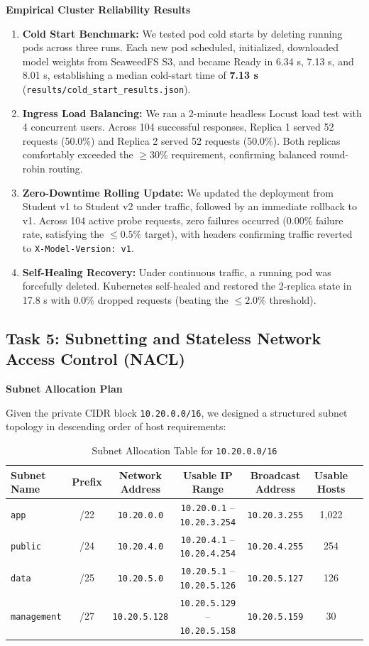 \documentclass[10pt,a4paper]{article}
\begin{document}
\textbf{Empirical Cluster Reliability Results}
\begin{enumerate}
    \item \textbf{Cold Start Benchmark:} We tested pod cold starts by deleting running pods across three runs. Each new pod scheduled, initialized, downloaded model weights from SeaweedFS S3, and became Ready in 6.34 s, 7.13 s, and 8.01 s, establishing a median cold-start time of \textbf{7.13 s} (\texttt{results/cold\_start\_results.json}).
    \item \textbf{Ingress Load Balancing:} We ran a 2-minute headless Locust load test with 4 concurrent users. Across 104 successful responses, Replica 1 served 52 requests (50.0\%) and Replica 2 served 52 requests (50.0\%). Both replicas comfortably exceeded the $\ge 30\%$ requirement, confirming balanced round-robin routing.
    \item \textbf{Zero-Downtime Rolling Update:} We updated the deployment from Student v1 to Student v2 under traffic, followed by an immediate rollback to v1. Across 104 active probe requests, zero failures occurred (0.00\% failure rate, satisfying the $\le 0.5\%$ target), with headers confirming traffic reverted to \texttt{X-Model-Version: v1}.
    \item \textbf{Self-Healing Recovery:} Under continuous traffic, a running pod was forcefully deleted. Kubernetes self-healed and restored the 2-replica state in 17.8 s with 0.0\% dropped requests (beating the $\le 2.0\%$ threshold).
\end{enumerate}

\subsection*{Task 5: Subnetting and Stateless Network Access Control (NACL)}

\textbf{Subnet Allocation Plan}

Given the private CIDR block \texttt{10.20.0.0/16}, we designed a structured subnet topology in descending order of host requirements:

\begin{table}[h!]
\centering
\small
\begin{tabular}{lcccccr}
\toprule
\textbf{Subnet Name} & \textbf{Prefix} & \textbf{Network Address} & \textbf{Usable IP Range} & \textbf{Broadcast Address} & \textbf{Usable Hosts} \\
\midrule
\texttt{app} & /22 & \texttt{10.20.0.0} & \texttt{10.20.0.1} -- \texttt{10.20.3.254} & \texttt{10.20.3.255} & 1,022 \\
\texttt{public} & /24 & \texttt{10.20.4.0} & \texttt{10.20.4.1} -- \texttt{10.20.4.254} & \texttt{10.20.4.255} & 254 \\
\texttt{data} & /25 & \texttt{10.20.5.0} & \texttt{10.20.5.1} -- \texttt{10.20.5.126} & \texttt{10.20.5.127} & 126 \\
\texttt{management} & /27 & \texttt{10.20.5.128} & \texttt{10.20.5.129} -- \texttt{10.20.5.158} & \texttt{10.20.5.159} & 30 \\
\bottomrule
\end{tabular}
\caption{Subnet Allocation Table for \texttt{10.20.0.0/16}}
\label{tab:task5_subnets}
\end{table}
\end{document}
